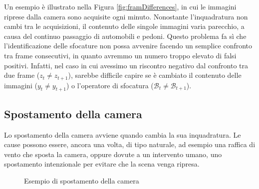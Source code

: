 \noindent Un esempio \`e illustrato nella Figura \ref{fig:framDifferences}, in cui le immagini riprese dalla camera sono acquisite ogni minuto. 
Nonostante l'inquadratura non cambi tra le acquisizioni, il contenuto delle singole immagini varia parecchio, a causa del continuo passaggio di automobili e pedoni.
Questo problema fa s\`i che l'identificazione delle sfocature non possa avvenire facendo un semplice confronto tra frame consecutivi, in quanto avremmo un numero troppo elevato di falsi positivi.
Infatti, nel caso in cui avessimo un riscontro negativo dal confronto tra due frame ($z_t \neq z_{t + 1}$), sarebbe difficile capire se \`e cambiato il contenuto delle immagini ($y_t \neq y_{t + 1}$) o l'operatore di sfocatura ($\mathcal{B}_t \neq \mathcal{B}_{t + 1}$). 
\subsection{Spostamento della camera}
\label{displacement}
Lo spostamento della camera avviene quando cambia la sua inquadratura.
Le cause possono essere, ancora una volta, di tipo naturale, ad esempio una raffica di vento che sposta la camera, oppure dovute a un intervento umano, uno spostamento intenzionale per evitare che la scena venga ripresa.
\begin{figure}[tb]
	\centering
	\caption{Esempio di spostamento della camera}
	\label{fig:testiDISPLACEMENT}
\end{figure}
